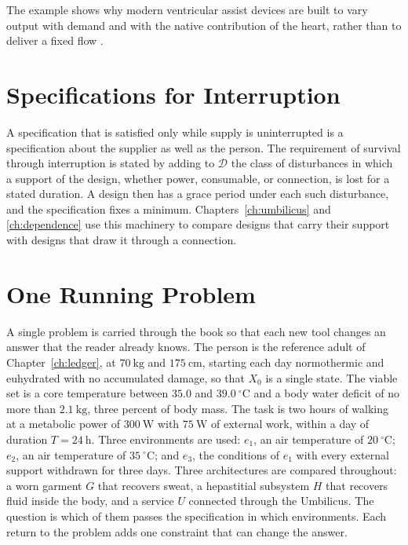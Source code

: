 \documentclass[11pt,openany]{book}
\theoremstyle{definition}
\theoremstyle{remark}
\newcommand{\Dset}{\mathcal{D}}
\begin{document}
The example shows why modern ventricular assist devices are built to vary output with demand and with the native contribution of the heart, rather than to deliver a fixed flow \cite{mehra2017}.

\section{Specifications for Interruption}

A specification that is satisfied only while supply is uninterrupted is a specification about the supplier as well as the person. The requirement of survival through interruption is stated by adding to $\Dset$ the class of disturbances in which a support of the design, whether power, consumable, or connection, is lost for a stated duration. A design then has a grace period under each such disturbance, and the specification fixes a minimum. Chapters~\ref{ch:umbilicus} and \ref{ch:dependence} use this machinery to compare designs that carry their support with designs that draw it through a connection.

\section{One Running Problem}

A single problem is carried through the book so that each new tool changes an answer that the reader already knows. The person is the reference adult of Chapter~\ref{ch:ledger}, at $70\ \mathrm{kg}$ and $175\ \mathrm{cm}$, starting each day normothermic and euhydrated with no accumulated damage, so that $X_0$ is a single state. The viable set is a core temperature between $35.0$ and $39.0\ ^\circ\mathrm{C}$ and a body water deficit of no more than $2.1\ \mathrm{kg}$, three percent of body mass. The task is two hours of walking at a metabolic power of $300\ \mathrm{W}$ with $75\ \mathrm{W}$ of external work, within a day of duration $T=24\ \mathrm{h}$. Three environments are used: $e_1$, an air temperature of $20\ ^\circ\mathrm{C}$; $e_2$, an air temperature of $35\ ^\circ\mathrm{C}$; and $e_3$, the conditions of $e_1$ with every external support withdrawn for three days. Three architectures are compared throughout: a worn garment $G$ that recovers sweat, a hepastitial subsystem $H$ that recovers fluid inside the body, and a service $U$ connected through the Umbilicus. The question is which of them passes the specification in which environments. Each return to the problem adds one constraint that can change the answer.
\end{document}
